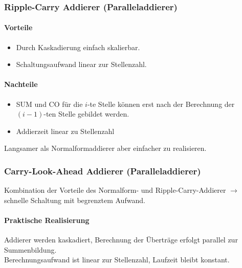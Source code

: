 \subsubsection{Ripple-Carry Addierer (Paralleladdierer)}
\begin{center}
    \small
    \begin{minipage}[t]{0.45\linewidth}
        \paragraph{Vorteile}
        \begin{itemize}
            \item Durch Kaskadierung einfach skalierbar.
            \item Schaltungsaufwand linear zur Stellenzahl.
        \end{itemize}
    \end{minipage}
    \hfill
    \begin{minipage}[t]{0.45\linewidth}
        \paragraph{Nachteile}
        \begin{itemize}
            \item SUM und CO für die $i$-te Stelle können erst nach der Berechnung der $(i-1)$-ten Stelle gebildet werden.
            \item Addierzeit linear zu Stellenzahl
        \end{itemize}
    \end{minipage}
\end{center}
Langsamer als Normalformaddierer aber einfacher zu realisieren.

\subsubsection{Carry-Look-Ahead Addierer (Paralleladdierer)}
Kombination der Vorteile des Normalform- und Ripple-Carry-Addierer $\rightarrow$ schnelle Schaltung mit begrenztem Aufwand.
\paragraph{Praktische Realisierung} Addierer werden kaskadiert, Berechnung der Überträge erfolgt parallel zur Summenbildung.\\
Berechnungsaufwand ist linear zur Stellenzahl, Laufzeit bleibt konstant.

